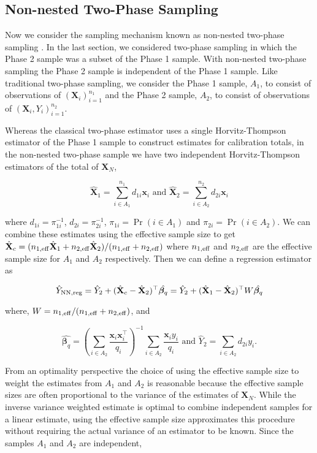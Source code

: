 \documentclass[12pt]{article}
\renewcommand{\bf}[1]{\mathbf{#1}}
\begin{document}
\subsection{Non-nested Two-Phase Sampling}

Now we consider the sampling mechanism known as non-nested two-phase sampling 
\citep{hidiroglou2001double}. In the last section, we considered two-phase sampling
in which the Phase 2 sample was a subset of the Phase 1 sample. With non-nested
two-phase sampling the Phase 2 sample is independent of the Phase 1 sample. 
Like traditional two-phase sampling, we consider the Phase 1 sample, $A_1$, to
consist of observations of $(\bf X_i)_{i = 1}^{n_1}$ and the Phase 2 sample,
$A_2$, to consist of observations of $(\bf X_i, Y_i)_{i = 1}^{n_2}$. 

Whereas the classical two-phase estimator uses a single Horvitz-Thompson
estimator of the Phase 1 sample to construct estimates for calibration totals,
in the non-nested two-phase sample we have two independent Horvitz-Thompson
estimators of the total of $\bf X_N$,

$$\hat{\bf X}_1 = \sum_{i \in A_1}^{n_1} d_{1i} \bf x_i \text{ and } 
\hat{\bf X}_2 = \sum_{i \in A_2}^{n_2} d_{2i} \bf x_i $$

where $d_{1i} = \pi_{1i}^{-1}$, $d_{2i} = \pi_{2i}^{-1}$, 
$\pi_{1i} = \Pr(i \in A_1)$ and $\pi_{2i} = \Pr(i \in A_2)$. 
We can combine these estimates using the effective sample size 
\citep{kish1965survey} to get
$\hat{\bf X}_c = (n_{1, \rm{eff}} \hat{\bf X}_1 + n_{2, \rm{eff}}\hat{\bf X}_2) / 
(n_{1, \rm{eff}} + n_{2, \rm{eff}})$ where $n_{1, \rm{eff}}$ and 
$n_{2, \rm{eff}}$ are the effective sample size for $A_1$ and $A_2$ respectively.
Then we can define a regression estimator as

$$
\hat Y_{\rm NN, reg} = \hat Y_2 + (\hat{\bf X}_c - \hat{\bf X}_2)^\top \hat{\bm \beta_q} = 
\hat Y_2 + (\hat{\bf X}_1 - \hat{\bf X}_2)^\top W\hat{\bm \beta_q}
$$

where, $W = n_{1, \rm{eff}} / (n_{1, \rm{eff}} + n_{2, \rm{eff}})$, and

$$
\hat{\bm \beta_q} = 
\left(\sum_{i \in A_2} \frac{\bf x_i \bf x_i^\top}{q_i}\right)^{-1} 
\sum_{i \in A_2} \frac{\bf x_i y_i}{q_i} \text{ and }
\hat Y_2 = \sum_{i \in A_2} d_{2i} y_i.
$$

From an optimality perspective the choice of using the effective sample size to
weight the estimates from $A_1$ and $A_2$ is reasonable because the
effective sample sizes are often proportional to the variance of the estimates 
of $\bf X_N$. While the inverse variance weighted estimate is optimal
to combine independent samples for a linear estimate, using the effective sample
size approximates this procedure without requiring the actual variance of an
estimator to be known. Since the samples $A_1$ and $A_2$ are independent, 
\end{document}

